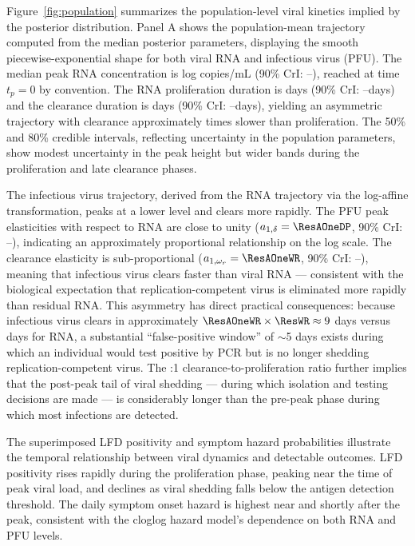 \documentclass[12pt]{article}
\begin{document}
Figure~\ref{fig:population} summarizes the population-level viral kinetics implied by the posterior distribution. Panel A shows the population-mean trajectory computed from the median posterior parameters, displaying the smooth piecewise-exponential shape for both viral RNA and infectious virus (PFU). The median peak RNA concentration is \ResDP{} log copies/mL (90\% CrI: \ResDPLo--\ResDPHi), reached at time $t_p = 0$ by convention. The RNA proliferation duration is \ResWP{} days (90\% CrI: \ResWPLo--\ResWPHi days) and the clearance duration is \ResWR{} days (90\% CrI: \ResWRLo--\ResWRHi days), yielding an asymmetric trajectory with clearance approximately \ResClearToProlif{} times slower than proliferation. The 50\% and 80\% credible intervals, reflecting uncertainty in the population parameters, show modest uncertainty in the peak height but wider bands during the proliferation and late clearance phases.

The infectious virus trajectory, derived from the RNA trajectory via the log-affine transformation, peaks at a lower level and clears more rapidly. The PFU peak elasticities with respect to RNA are close to unity ($a_{1,\delta} = \ResAOneDP$, 90\% CrI: \ResAOneDPLo--\ResAOneDPHi), indicating an approximately proportional relationship on the log scale. The clearance elasticity is sub-proportional ($a_{1,\omega_r} = \ResAOneWR$, 90\% CrI: \ResAOneWRLo--\ResAOneWRHi), meaning that infectious virus clears faster than viral RNA --- consistent with the biological expectation that replication-competent virus is eliminated more rapidly than residual RNA. This asymmetry has direct practical consequences: because infectious virus clears in approximately $\ResAOneWR \times \ResWR \approx 9$ days versus \ResWR{} days for RNA, a substantial ``false-positive window'' of $\sim$5 days exists during which an individual would test positive by PCR but is no longer shedding replication-competent virus. The \ResClearToProlif{}:1 clearance-to-proliferation ratio further implies that the post-peak tail of viral shedding --- during which isolation and testing decisions are made --- is considerably longer than the pre-peak phase during which most infections are detected.

The superimposed LFD positivity and symptom hazard probabilities illustrate the temporal relationship between viral dynamics and detectable outcomes. LFD positivity rises rapidly during the proliferation phase, peaking near the time of peak viral load, and declines as viral shedding falls below the antigen detection threshold. The daily symptom onset hazard is highest near and shortly after the peak, consistent with the cloglog hazard model's dependence on both RNA and PFU levels.
\end{document}
